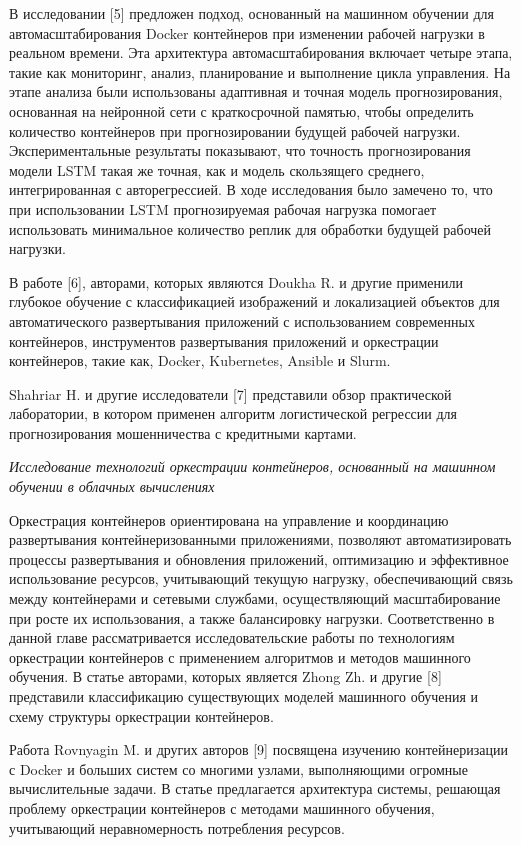 В исследовании {[}5{]} предложен подход, основанный на машинном обучении
для автомасштабирования Docker контейнеров при изменении рабочей
нагрузки в реальном времени. Эта архитектура автомасштабирования
включает четыре этапа, такие как мониторинг, анализ, планирование и
выполнение цикла управления. На этапе анализа были использованы
адаптивная и точная модель прогнозирования, основанная на нейронной сети
с краткосрочной памятью, чтобы определить количество контейнеров при
прогнозировании будущей рабочей нагрузки. Экспериментальные результаты
показывают, что точность прогнозирования модели LSTM такая же точная,
как и модель скользящего среднего, интегрированная с авторегрессией. В
ходе исследования было замечено то, что при использовании LSTM
прогнозируемая рабочая нагрузка помогает использовать минимальное
количество реплик для обработки будущей рабочей нагрузки.

В работе {[}6{]}, авторами, которых являются Doukha R. и другие
применили глубокое обучение с классификацией изображений и локализацией
объектов для автоматического развертывания приложений с использованием
современных контейнеров, инструментов развертывания приложений и
оркестрации контейнеров, такие как, Docker, Kubernetes, Ansible и Slurm.

Shahriar H. и другие исследователи {[}7{]} представили обзор
практической лаборатории, в котором применен алгоритм логистической
регрессии для прогнозирования мошенничества с кредитными картами.

\emph{Исследование технологий оркестрации контейнеров, основанный на
машинном обучении в облачных вычислениях}

Оркестрация контейнеров ориентирована на управление и координацию
развертывания контейнеризованными приложениями, позволяют
автоматизировать процессы развертывания и обновления приложений,
оптимизацию и эффективное использование ресурсов, учитывающий текущую
нагрузку, обеспечивающий связь между контейнерами и сетевыми службами,
осуществляющий масштабирование при росте их использования, а также
балансировку нагрузки. Соответственно в данной главе рассматривается
исследовательские работы по технологиям оркестрации контейнеров с
применением алгоритмов и методов машинного обучения. В статье авторами,
которых является Zhong Zh. и другие {[}8{]} представили классификацию
существующих моделей машинного обучения и схему структуры оркестрации
контейнеров.

Работа Rovnyagin M. и других авторов {[}9{]} посвящена изучению
контейнеризации с Docker и больших систем со многими узлами,
выполняющими огромные вычислительные задачи. В статье предлагается
архитектура системы, решающая проблему оркестрации контейнеров с
методами машинного обучения, учитывающий неравномерность потребления
ресурсов.

